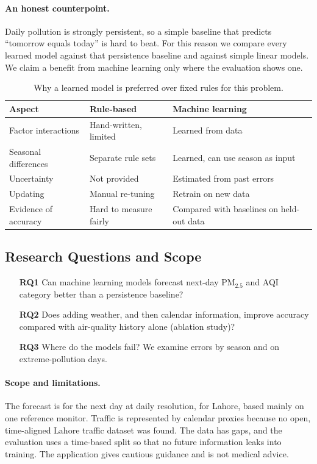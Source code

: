 \paragraph{An honest counterpoint.} Daily pollution is strongly persistent, so a simple baseline that predicts ``tomorrow equals today'' is hard to beat. For this reason we compare every learned model against that persistence baseline and against simple linear models. We claim a benefit from machine learning only where the evaluation shows one.

\begin{table}[h]
\centering
\small
\begin{tabular}{L{4.0cm}L{4.9cm}L{4.9cm}}
\toprule
\textbf{Aspect} & \textbf{Rule-based} & \textbf{Machine learning} \\
\midrule
Factor interactions & Hand-written, limited & Learned from data \\
Seasonal differences & Separate rule sets & Learned, can use season as input \\
Uncertainty & Not provided & Estimated from past errors \\
Updating & Manual re-tuning & Retrain on new data \\
Evidence of accuracy & Hard to measure fairly & Compared with baselines on held-out data \\
\bottomrule
\end{tabular}
\caption{Why a learned model is preferred over fixed rules for this problem.}
\end{table}

\subsection{Research Questions and Scope}

\begin{enumerate}
  \item[\textbf{RQ1}] Can machine learning models forecast next-day PM$_{2.5}$ and AQI category better than a persistence baseline?
  \item[\textbf{RQ2}] Does adding weather, and then calendar information, improve accuracy compared with air-quality history alone (ablation study)?
  \item[\textbf{RQ3}] Where do the models fail? We examine errors by season and on extreme-pollution days.
\end{enumerate}

\paragraph{Scope and limitations.} The forecast is for the next day at daily resolution, for Lahore, based mainly on one reference monitor. Traffic is represented by calendar proxies because no open, time-aligned Lahore traffic dataset was found. The data has gaps, and the evaluation uses a time-based split so that no future information leaks into training. The application gives cautious guidance and is not medical advice.

